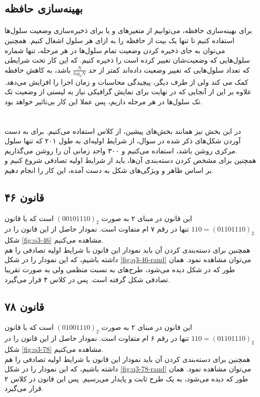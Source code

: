 \documentclass[11pt, a4paper]{article}
\begin{document}
\subsection{بهینه‌سازی حافظه}
\paragraph{}
برای بهینه‌سازی حافظه، می‌توانیم از متغیر‌های  و یا  برای ذخیره‌سازی وضعیت سلول‌ها استفاده کنیم تا تنها یک بیت از حافظه را به ازای هر سلول اشغال کنیم. همچنین می‌توان به جای ذخیره کردن وضعیت تمام سلول‌ها در هر مرحله، تنها شماره سلول‌هایی که وضعیت‌شان تغییر کرده است را ذخیره کنیم. که این‌ کار تحت شرایطی که تعداد سلول‌هایی که تغییر وضعیت داده‌اند کمتر از حد $\frac{N}{log_2 N}$ باشد، به کاهش حافظه کمک می کند ولی از طرف دیگر، پیچیدگی محاسبات و زمان اجرا را افزایش می‌دهد. علاوه بر این از آنجایی که در نهایت برای نمایش گرافیکی نیاز به لیستی از وضعیت تک تک سلول‌ها در هر مرحله داریم، پس عملا این کار بی‌تاثیر خواهد بود.

\section{\textbf{}}
\paragraph{}
در این بخش نیز همانند بخش‌های پیشین، از کلاس  استفاده می‌کنیم. برای به دست آوردن شکل‌های ذکر شده در سوال، از شرایط اولیه‌ای به طول ۲۰۱ که تنها سلول مرکزی روشن باشد، استفاده می‌کنیم و ۳۰۰ واحد زمانی آن را روشن می‌گذاریم.\\
همچنین برای مشخص کردن دسته‌بندی‌ آن‌ها، باید از شرایط اولیه تصادفی شروع کنیم و بر اساس ظاهر و ویژگی‌های شکل به دست آمده، این کار را انجام دهیم.

\subsection{قانون ۴۶}
این قانون در مبنای ۲ به صورت $(00101110)_2$ است که با قانون $110=(01101110)_2$ تنها در رقم ۷ ام متفاوت است. نمودار حاصل از این قانون را در شکل \ref{fig:q3-46} مشاهده می‌کنیم.\\
همچنین برای دسته‌بندی کردن آن باید نمودار این قانون با شرایط اولیه تصادفی را هم داشته باشیم، که این نمودار را در شکل \ref{fig:q3-46-rand} می‌توان مشاهده نمود. همان طور که در شکل دیده می‌شود، طرح‌های به نسبت منظمی ولی به صورت تقریبا تصادفی شکل گرفته است. پس در کلاس ۴ قرار می‌گیرد.

\subsection{قانون ۷۸}
این قانون در مبنای ۲ به صورت $(01001110)_2$ است که با قانون $110=(01101110)_2$ تنها در رقم ۶ ام متفاوت است. نمودار حاصل از این قانون را در شکل \ref{fig:q3-78} مشاهده می‌کنیم.\\
همچنین برای دسته‌بندی کردن آن باید نمودار این قانون با شرایط اولیه تصادفی را هم داشته باشیم، که این نمودار را در شکل \ref{fig:q3-78-rand} می‌توان مشاهده نمود. همان طور که دیده می‌شود، به یک طرح ثابت و پایدار می‌رسیم. پس این قانون در کلاس ۲ قرار می‌گیرد.
\end{document}
